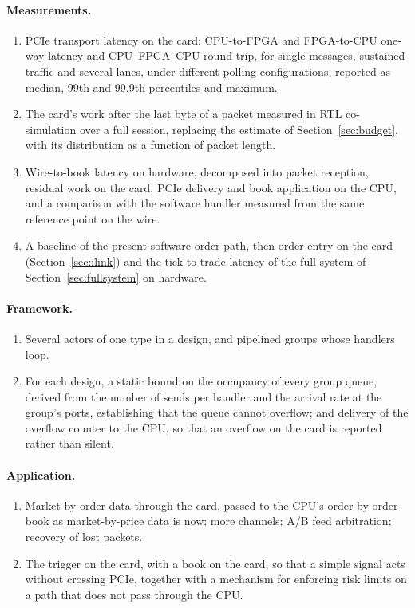 \documentclass[11pt]{article}
\begin{document}
\paragraph{Measurements.}
\begin{enumerate}[leftmargin=1.6em]
  \item PCIe transport latency on the card: CPU-to-FPGA and FPGA-to-CPU one-way
  latency and CPU--FPGA--CPU round trip, for single messages, sustained
  traffic and several lanes, under different polling configurations, reported
  as median, 99th and 99.9th percentiles and maximum.
  \item The card's work after the last byte of a packet measured in RTL
  co-simulation over a full session, replacing the estimate of
  Section~\ref{sec:budget}, with its distribution as a function of packet
  length.
  \item Wire-to-book latency on hardware, decomposed into packet reception,
  residual work on the card, PCIe delivery and book application on the CPU,
  and a comparison with the software handler measured from the same reference
  point on the wire.
  \item A baseline of the present software order path, then order entry on the
  card (Section~\ref{sec:ilink}) and the tick-to-trade latency of the full
  system of Section~\ref{sec:fullsystem} on hardware.
\end{enumerate}

\paragraph{Framework.}
\begin{enumerate}[leftmargin=1.6em]
  \item Several actors of one type in a design, and pipelined groups whose
  handlers loop.
  \item For each design, a static bound on the occupancy of every group queue,
  derived from the number of sends per handler and the arrival rate at the
  group's ports, establishing that the queue cannot overflow; and delivery of
  the overflow counter to the CPU, so that an overflow on the card is reported
  rather than silent.
\end{enumerate}

\paragraph{Application.}
\begin{enumerate}[leftmargin=1.6em]
  \item Market-by-order data through the card, passed to the CPU's
  order-by-order book as market-by-price data is now; more channels; A/B feed
  arbitration; recovery of lost packets.
  \item The trigger on the card, with a book on the card, so that a simple
  signal acts without crossing PCIe, together with a mechanism for enforcing
  risk limits on a path that does not pass through the CPU.
\end{enumerate}
\end{document}
